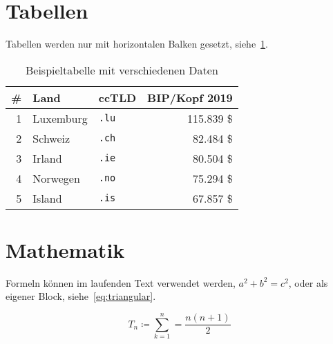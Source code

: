 \section{Tabellen}

Tabellen werden nur mit horizontalen Balken gesetzt, siehe~\cref{tab:example}.

\begin{table}[htbp]
  \centering\begin{tabular}{rllr} \toprule
    \# & Land      & ccTLD      & BIP/Kopf 2019 \\ \midrule
    1  & Luxemburg & \verb!.lu! & 115.839 \$    \\
    2  & Schweiz   & \verb!.ch! & 82.484 \$     \\
    3  & Irland    & \verb!.ie! & 80.504 \$     \\
    4  & Norwegen  & \verb!.no! & 75.294 \$     \\
    5  & Island    & \verb!.is! & 67.857 \$     \\ \bottomrule
  \end{tabular}
  \caption{Beispieltabelle mit verschiedenen Daten\label{tab:example}}
\end{table}

\section{Mathematik}

Formeln können im laufenden Text verwendet werden, \(a^2 + b^2 = c^2\),
oder als eigener Block, siehe~\cref{eq:triangular}.

\begin{equation}
  \label{eq:triangular}
  T_n \coloneq \sum^{n}_{k=1} = \frac{n(n+1)}{2}
\end{equation}
